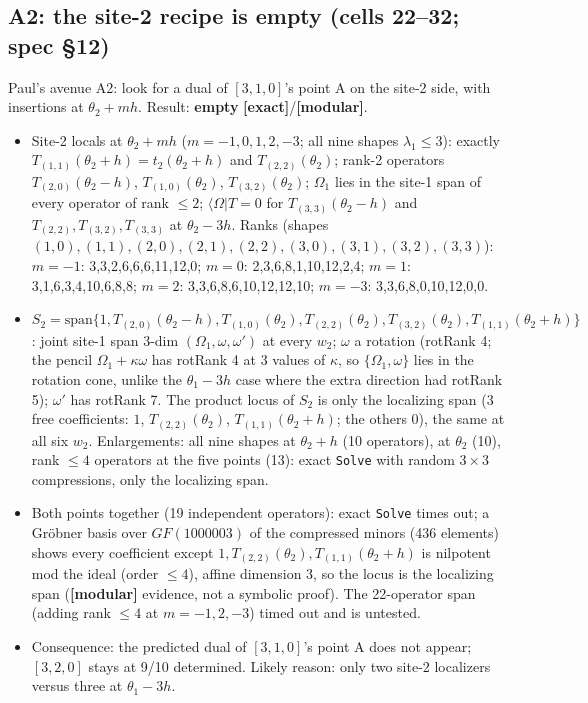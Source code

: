 \documentclass[11pt]{article}
\newcommand{\bra}[1]{\langle #1|}
\newcommand{\Om}{\Omega}
\newcommand{\Tt}[1]{T_{#1}}
\newcommand{\ex}{\textbf{[exact]}}
\newcommand{\md}{\textbf{[modular]}}
\begin{document}
\subsection{A2: the site-2 recipe is empty (cells 22--32; spec \S12)}

Paul's avenue A2: look for a dual of $[3,1,0]$'s point A on the site-2 side, with insertions at $\theta_2+mh$. Result: \textbf{empty} \ex/\md.
\begin{itemize}
\item Site-2 locals at $\theta_2+mh$ ($m=-1,0,1,2,-3$; all nine shapes $\lambda_1\le3$): exactly $\Tt{(1,1)}(\theta_2+h)=t_2(\theta_2+h)$ and $\Tt{(2,2)}(\theta_2)$; rank-2 operators $\Tt{(2,0)}(\theta_2-h)$, $\Tt{(1,0)}(\theta_2)$, $\Tt{(3,2)}(\theta_2)$; $\Om_1$ lies in the site-1 span of every operator of rank $\le2$; $\bra\Om T=0$ for $\Tt{(3,3)}(\theta_2-h)$ and $\Tt{(2,2)},\Tt{(3,2)},\Tt{(3,3)}$ at $\theta_2-3h$. Ranks (shapes $(1,0),(1,1),(2,0),(2,1),(2,2),(3,0),(3,1),(3,2),(3,3)$): $m=-1$: 3,3,2,6,6,6,11,12,0; $m=0$: 2,3,6,8,1,10,12,2,4; $m=1$: 3,1,6,3,4,10,6,8,8; $m=2$: 3,3,6,8,6,10,12,12,10; $m=-3$: 3,3,6,8,0,10,12,0,0.
\item $S_2=\mathrm{span}\{1,\Tt{(2,0)}(\theta_2-h),\Tt{(1,0)}(\theta_2),\Tt{(2,2)}(\theta_2),\Tt{(3,2)}(\theta_2),\Tt{(1,1)}(\theta_2+h)\}$: joint site-1 span 3-dim $(\Om_1,\omega,\omega')$ at every $w_2$; $\omega$ a rotation (rotRank 4; the pencil $\Om_1+\kappa\omega$ has rotRank 4 at 3 values of $\kappa$, so $\{\Om_1,\omega\}$ lies in the rotation cone, unlike the $\theta_1-3h$ case where the extra direction had rotRank 5); $\omega'$ has rotRank 7. The product locus of $S_2$ is only the localizing span (3 free coefficients: $1$, $\Tt{(2,2)}(\theta_2)$, $\Tt{(1,1)}(\theta_2+h)$; the others 0), the same at all six $w_2$. Enlargements: all nine shapes at $\theta_2+h$ (10 operators), at $\theta_2$ (10), rank $\le4$ operators at the five points (13): exact \texttt{Solve} with random $3\times3$ compressions, only the localizing span.
\item Both points together (19 independent operators): exact \texttt{Solve} times out; a Gr\"obner basis over $GF(1000003)$ of the compressed minors (436 elements) shows every coefficient except $1,\Tt{(2,2)}(\theta_2),\Tt{(1,1)}(\theta_2+h)$ is nilpotent mod the ideal (order $\le4$), affine dimension 3, so the locus is the localizing span (\md{} evidence, not a symbolic proof). The 22-operator span (adding rank $\le4$ at $m=-1,2,-3$) timed out and is untested.
\item Consequence: the predicted dual of $[3,1,0]$'s point A does not appear; $[3,2,0]$ stays at 9/10 determined. Likely reason: only two site-2 localizers versus three at $\theta_1-3h$.
\end{itemize}
\end{document}
